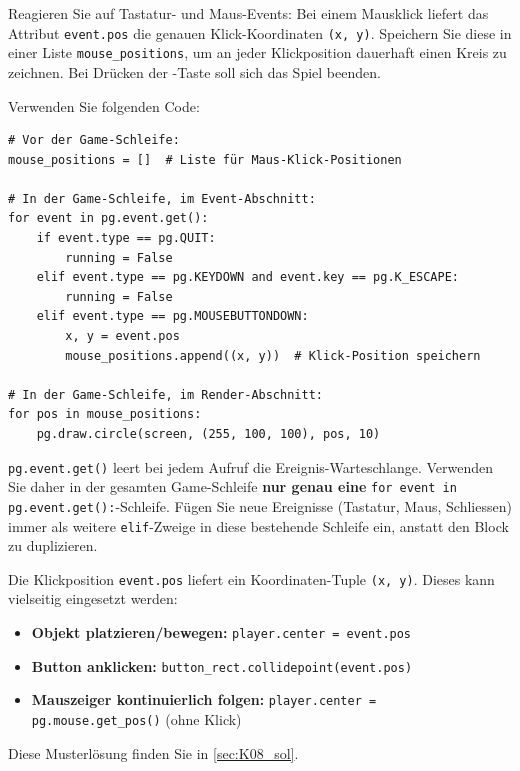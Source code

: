 \begin{myexercise}\label{myexercise:Ereignisse}
    \begin{sloppypar}Reagieren Sie auf Tastatur- und Maus-Events: Bei einem Mausklick liefert das Attribut \lstinline|event.pos| die genauen Klick-Koordinaten \lstinline|(x, y)|. Speichern Sie diese in einer Liste \lstinline|mouse_positions|, um an jeder Klickposition dauerhaft einen Kreis zu zeichnen. Bei Drücken der -Taste soll sich das Spiel beenden.\end{sloppypar}

    Verwenden Sie folgenden Code:
    \begin{lstlisting}
# Vor der Game-Schleife:
mouse_positions = []  # Liste für Maus-Klick-Positionen

# In der Game-Schleife, im Event-Abschnitt:
for event in pg.event.get():
    if event.type == pg.QUIT:
        running = False
    elif event.type == pg.KEYDOWN and event.key == pg.K_ESCAPE:
        running = False
    elif event.type == pg.MOUSEBUTTONDOWN:
        x, y = event.pos
        mouse_positions.append((x, y))  # Klick-Position speichern

# In der Game-Schleife, im Render-Abschnitt:
for pos in mouse_positions:
    pg.draw.circle(screen, (255, 100, 100), pos, 10)
\end{lstlisting}

    \begin{myattention}
        \lstinline|pg.event.get()| leert bei jedem Aufruf die Ereignis-Warteschlange. Verwenden Sie daher in der gesamten Game-Schleife \textbf{nur genau eine} \lstinline|for event in pg.event.get():|-Schleife. Fügen Sie neue Ereignisse (Tastatur, Maus, Schliessen) immer als weitere \lstinline|elif|-Zweige in diese bestehende Schleife ein, anstatt den Block zu duplizieren.
    \end{myattention}

    \begin{myremark}
        Die Klickposition \lstinline|event.pos| liefert ein Koordinaten-Tuple \lstinline|(x, y)|. Dieses kann vielseitig eingesetzt werden:
        \begin{itemize}
            \item \textbf{Objekt platzieren/bewegen:} \lstinline|player.center = event.pos|
            \item \textbf{Button anklicken:} \lstinline|button_rect.collidepoint(event.pos)|
            \item \textbf{Mauszeiger kontinuierlich folgen:} \lstinline|player.center = pg.mouse.get_pos()| (ohne Klick)
        \end{itemize}
    \end{myremark}

	\begin{myanswer}
		Diese Musterlösung finden Sie in \cref{sec:K08_sol}.
	\end{myanswer}
\end{myexercise}

